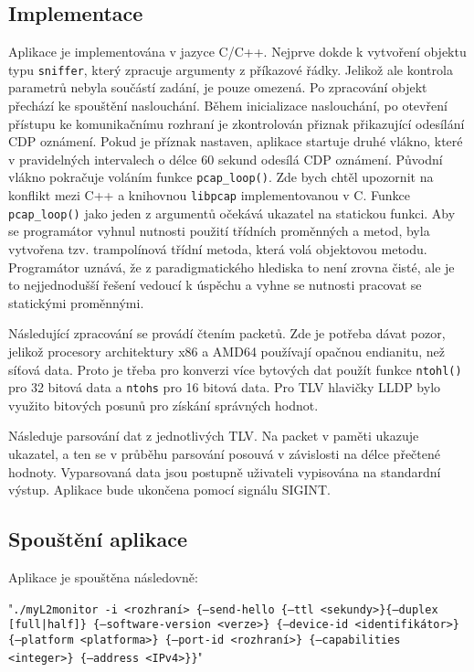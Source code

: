 \documentclass[a4paper,12pt]{article}
\begin{document}
	\subsection{Implementace}
		Aplikace je implementována v jazyce C/C++. Nejprve dokde k vytvoření objektu typu \texttt{sniffer}, který zpracuje argumenty z příkazové řádky. Jelikož ale kontrola parametrů nebyla součástí zadání, je pouze omezená. Po zpracování objekt přechází ke spouštění naslouchání. Během inicializace naslouchání, po otevření přístupu ke komunikačnímu rozhraní je zkontrolován přiznak přikazující odesílání CDP oznámení. Pokud je příznak nastaven, aplikace startuje druhé vlákno, které v pravidelných intervalech o délce 60 sekund odesílá CDP oznámení. Původní vlákno pokračuje voláním funkce \texttt{pcap\_loop()}. Zde bych chtěl upozornit na konflikt mezi C++ a knihovnou \texttt{libpcap} implementovanou v C. Funkce \texttt{pcap\_loop()} jako jeden z argumentů očekává ukazatel na statickou funkci. Aby se programátor vyhnul nutnosti použití třídních proměnných a metod, byla vytvořena tzv. trampolínová třídní metoda, která volá objektovou metodu. Programátor uznává, že z paradigmatického hlediska to není zrovna čisté, ale je to nejjednodušší řešení vedoucí k úspěchu a vyhne se nutnosti pracovat se statickými proměnnými.\par
		
		Následující zpracování se provádí čtením packetů. Zde je potřeba dávat pozor, jelikož procesory architektury x86 a AMD64 používají opačnou endianitu, než síťová data. Proto je třeba pro konverzi více bytových dat použít funkce \texttt{ntohl()} pro 32 bitová data a \texttt{ntohs} pro 16 bitová data. Pro TLV hlavičky LLDP bylo využito bitových posunů pro získání správných hodnot.
		\par
		Následuje parsování dat z jednotlivých TLV. Na packet v paměti ukazuje ukazatel, a ten se v průběhu parsování posouvá v závislosti na délce přečtené hodnoty. Vyparsovaná data jsou postupně uživateli vypisována na standardní výstup. Aplikace bude ukončena pomocí signálu SIGINT.
		
	\subsection{Spouštění aplikace}
		Aplikace je spouštěna následovně:\par
		"\texttt{./myL2monitor -i <rozhraní> \{--send-hello \{--ttl <sekundy>\}\{--duplex [full|half]\} \{--software-version <verze>\} \{--device-id <identifikátor>\} \{--platform <platforma>\} \{--port-id <rozhraní>\} \{--capabilities <integer>\} \{--address <IPv4>\}\}}" \cite{wis:zadani}\par
		
\end{document}
